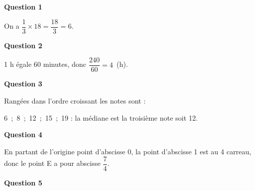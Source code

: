 \medskip


\medskip

\textbf{Question 1}

On a $\dfrac13 \times 18 = \dfrac{18}{3} = 6$.

\medskip

\textbf{Question 2}

1 h égale 60 minutes, donc $\dfrac{240}{60} = 4$~(h).
\medskip

\textbf{Question 3}

Rangées dans l'ordre croissant les notes sont :

6~;~8~;~12~;~15~;~19 : la médiane est la troisième note soit 12.

\medskip

\textbf{Question 4}

%
En partant de l'origine point d'abscisse $0$, la point d'abscisse 1 est au 4 carreau, donc le point E a pour abscisse $\dfrac74$.
\medskip

\textbf{Question 5}


